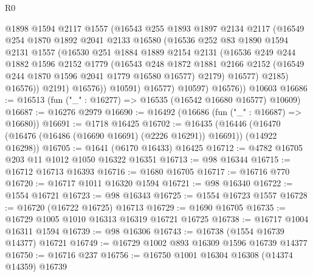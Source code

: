 \begin{lexlean}{R0}
\begin{coremodule}
                  @1898
                  @1594
                  @2117
                  @1557
                  (@16543
                    @255
                    @1893
                    @1897
                    @2134
                    @2117
                    (@16549
                      @254
                      @1870
                      @1892
                      @2041
                      @2133
                      @16580
                      (@16536
                        @252
                        @83
                        @1890
                        @1594
                        @2131
                        @1557
                        (@16530
                          @251
                          @1884
                          @1889
                          @2154
                          @2131
                          (@16536
                            @249
                            @244
                            @1882
                            @1596
                            @2152
                            @1779
                            (@16543
                              @248
                              @1872
                              @1881
                              @2166
                              @2152
                              (@16549 @244 @1870 @1596 @2041 @1779 @16580 @16577)
                              @2179)
                            @16577)
                          @2185)
                        @16576))
                    @2191)
                  @16576))
              @10591)
            @16577)
          @10597)
        @16576))
    @10603
@16686 := @16513 (fun ("_" : @16277) => @16535 (@16542 @16680 @16577) @10609)
@16687 := @16276 @2979
@16690 := @16492 (@16686 (fun ("_" : @16687) => @16680))
@16691 := @1718 @16425
@16702 := @16435
    (@16446 (@16470 (@16476 (@16486 (@16690 @16691) (@2226 @16291)) @16691)) (@14922 @16298))
@16705 := @1641 (@6170 @16433) @16425
@16712 := @4782 @16705 @203 @11 @1012 @1050 @16322 @16351
@16713 := @98 @16344
@16715 := @16712 @16713 @16393
@16716 := @1680 @16705
@16717 := @16716 @770
@16720 := @16717 @1011 @16320 @1594
@16721 := @98 @16340
@16722 := @1554 @16721
@16723 := @98 @16343
@16725 := @1554 @16723 @1557
@16728 := @16720 (@16722 @16725) @16713
@16729 := @1690 @16705
@16735 := @16729 @1005 @1010 @16313 @16319 @16721 @16725
@16738 := @16717 @1004 @16311 @1594
@16739 := @98 @16306
@16743 := @16738 (@1554 @16739 @14377) @16721
@16749 := @16729 @1002 @893 @16309 @1596 @16739 @14377
@16750 := @16716 @237
@16756 := @16750 @1001 @16304 @16308 (@14374 @14359) @16739

\end{coremodule}
\end{lexlean}
